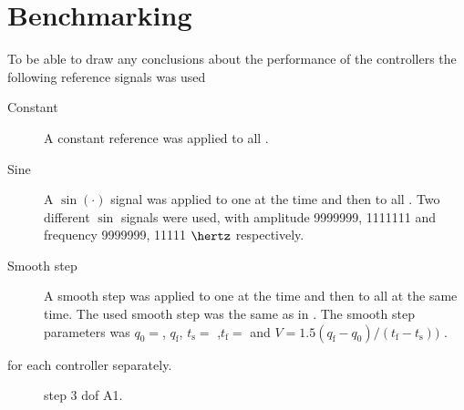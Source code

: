 \section{Benchmarking}
To be able to draw any conclusions about the performance of the controllers the following reference signals was used
\begin{description}
\item[Constant] A constant reference was applied to all \abbrDOF.
\item[Sine] A $\sin(\cdot)$ signal  was applied to one \abbrDOF at the time and then to all \abbrDOF. Two different $\sin$ signals were used, with amplitude {\color{red} 9999999, 1111111} and frequency {\color{red} 9999999, 11111} $\hertz$ respectively. 
\item[Smooth step] A smooth step was applied to one \abbrDOF at the time and then to all \abbrDOF at the same time. The used smooth step was the same as in \citet[p. 192-195]{robotics}. The smooth step parameters was $q_{\text{0}} = $, $q_{\text{f}}$, $t_{\text{s}} = $ ,$t_{\text{f}} = $ and $V = 1.5 (q_{\text{f}} - q_{\text{0}})/(t_{\text{f}} - t_{\text{s}}))$ .  
\end{description}
for each controller separately.
\begin{figure}[tbp]
  \centering
  \qquad
  \qquad
  \qquad
  \qquad
  \qquad
   \caption{\label{fig:StepRate}%
    step 3 dof A1.}
\end{figure}

